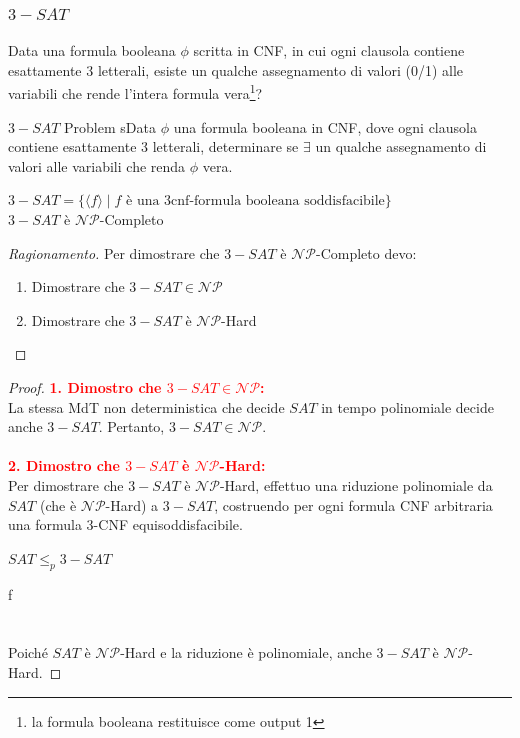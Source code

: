 \documentclass{article}  %
\theoremstyle{definition}
\newenvironment{ragionamento}[1][]
  {\begin{proof}[Ragionamento#1]\renewcommand{\qedsymbol}{}\normalfont}
  {\end{proof}}
\begin{document}
\subsubsection{$3-SAT$}
Data una formula booleana $\phi$ scritta in CNF, in cui ogni clausola contiene esattamente 3 letterali,
 esiste un qualche assegnamento di valori (0/1) alle variabili che rende l'intera formula vera\footnote{la formula booleana
	restituisce come output 1}?
\begin{theorem}{$3-SAT$ Problem}
	sData $\phi$ una formula booleana in CNF, dove ogni clausola contiene esattamente 3 letterali, determinare se $\exists$ un qualche
	assegnamento di valori alle variabili che renda $\phi$ vera.
	\begin{center}
		$3-SAT = \{\langle f \rangle \mid f \text{ è una 3cnf-formula booleana soddisfacibile}\}$ \\
		$3-SAT$ è $\mathcal{NP}$-Completo
	\end{center}
	\footnotesize
	\begin{ragionamento}
		Per dimostrare che $3-SAT$ è $\mathcal{NP}$-Completo devo:
		\begin{enumerate}
			\item Dimostrare che $3-SAT \in \mathcal{NP}$
			\item Dimostrare che $3-SAT$ è $\mathcal{NP}$-Hard
		\end{enumerate}
	\end{ragionamento}
	\begin{proof}
		\textcolor{red}{\textbf{1. Dimostro che $3-SAT \in \mathcal{NP}$:}}\\
		La stessa MdT non deterministica che decide $SAT$ in tempo polinomiale decide anche $3-SAT$.
		Pertanto, $3-SAT \in \mathcal{NP}$. \\ \\
		\textcolor{red}{\textbf{2. Dimostro che $3-SAT$ è $\mathcal{NP}$-Hard:}}\\
		Per dimostrare che $3-SAT$ è $\mathcal{NP}$-Hard, effettuo una riduzione polinomiale da $SAT$ (che è $\mathcal{NP}$-Hard) a $3-SAT$, 
		costruendo per ogni formula CNF arbitraria una formula 3-CNF equisoddisfacibile. 
		\begin{center}
			$SAT \leq_p 3-SAT$
		\end{center}
		
		
		f
		\\ \\ \\
		Poiché $SAT$ è $\mathcal{NP}$-Hard e 
		la riduzione è polinomiale, anche $3-SAT$ è $\mathcal{NP}$-Hard.
	\end{proof}
\end{theorem}
\end{document}
